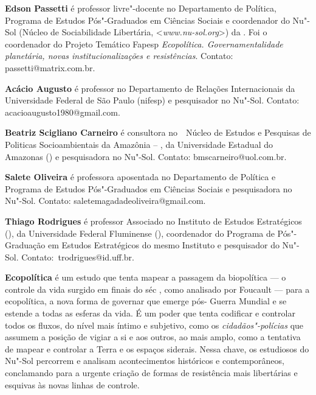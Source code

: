 \textbf{Edson Passetti} é professor livre"-docente no Departamento de Política, Programa de Estudos Pós"-Graduados em Ciências Sociais e coordenador do Nu"-Sol (Núcleo de Sociabilidade Libertária, \textless{}\emph{www.nu-sol.org}\textgreater{}) da . Foi o coordenador do Projeto Temático Fapesp \emph{Ecopolítica. Governamentalidade planetária, novas institucionalizações e resistências}. Contato: passetti@matrix.com.br.

\textbf{Acácio Augusto} é professor no Departamento de Relações Internacionais da Universidade Federal de São Paulo (nifesp) e pesquisador no Nu"-Sol. Contato: acacioaugusto1980@gmail.com.

\textbf{Beatriz Scigliano Carneiro} é consultora no  Núcleo de Estudos e Pesquisas de Politicas Socioambientais da Amazônia -- , da Universidade Estadual do Amazonas () e pesquisadora no Nu"-Sol. Contato: bmscarneiro@uol.com.br.

\textbf{Salete Oliveira} é professora aposentada no Departamento de Política e Programa de Estudos Pós"-Graduados em Ciências Sociais e pesquisadora no Nu"-Sol. Contato: saletemagadadeoliveira@gmail.com.

\textbf{Thiago Rodrigues} é professor Associado no Instituto de Estudos Estratégicos (), da Universidade Federal Fluminense (), coordenador do Programa de Pós"-Graduação em Estudos Estratégicos do mesmo Instituto e pesquisador do Nu"-Sol. Contato: trodrigues@id.uff.br.

\textbf{Ecopolítica} é um estudo que tenta mapear a passagem da biopolítica --- o controle da vida surgido em finais do séc , como analisado por Foucault --- para a ecopolítica, a nova forma de governar que emerge pós- Guerra Mundial e se estende a todas as esferas da vida. É um poder que tenta codificar e controlar todos os fluxos,  do nível mais íntimo e subjetivo, como os \emph{cidadãos"-polícias} que assumem a posição de vigiar a si e aos outros, ao mais amplo, como a tentativa de mapear e controlar a Terra e os espaços siderais. Nessa chave, os estudiosos do Nu"-Sol percorrem e analisam acontecimentos históricos e contemporâneos, conclamando para a urgente criação de formas de resistência mais libertárias e esquivas às novas linhas de controle.





